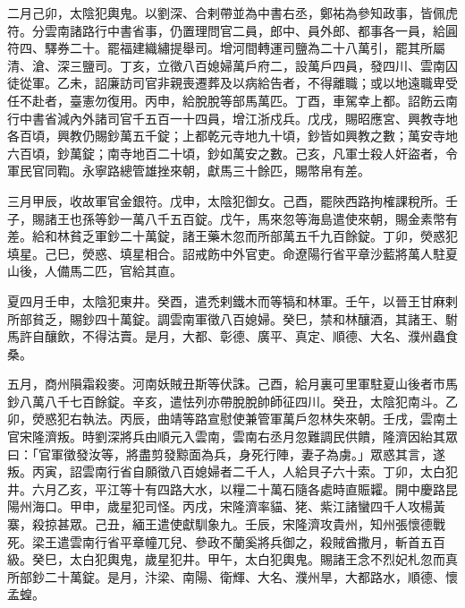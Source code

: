 \begin{pinyinscope}
 二月己卯，太陰犯輿鬼。以劉深、合剌帶並為中書右丞，鄭祐為參知政事，皆佩虎符。分雲南諸路行中書省事，仍置理問官二員，郎中、員外郎、都事各一員，給圓符四、驛券二十。罷福建織繡提舉司。增河間轉運司鹽為二十八萬引，罷其所屬清、滄、深三鹽司。丁亥，立徵八百媳婦萬戶府二，設萬戶四員，發四川、雲南囚徒從軍。乙未，詔廉訪司官非親喪遷葬及以病給告者，不得離職；或以地遠職卑受任不赴者，臺憲勿復用。丙申，給脫脫等部馬萬匹。丁酉，車駕幸上都。詔飭云南行中書省減內外諸司官千五百一十四員，增江浙戍兵。戊戌，賜昭應宮、興教寺地各百頃，興教仍賜鈔萬五千錠；上都乾元寺地九十頃，鈔皆如興教之數；萬安寺地六百頃，鈔萬錠；南寺地百二十頃，鈔如萬安之數。己亥，凡軍士殺人奸盜者，令軍民官同鞫。永寧路總管雄挫來朝，獻馬三十餘匹，賜幣帛有差。



 三月甲辰，收故軍官金銀符。戊申，太陰犯御女。己酉，罷陜西路拘榷課稅所。壬子，賜諸王也孫等鈔一萬八千五百錠。戊午，馬來忽等海島遣使來朝，賜金素幣有差。給和林貧乏軍鈔二十萬錠，諸王藥木忽而所部萬五千九百餘錠。丁卯，熒惑犯填星。己巳，熒惑、填星相合。詔戒飭中外官吏。命遼陽行省平章沙藍將萬人駐夏山後，人備馬二匹，官給其直。



 夏四月壬申，太陰犯東井。癸酉，遣禿剌鐵木而等犒和林軍。壬午，以晉王甘麻剌所部貧乏，賜鈔四十萬錠。調雲南軍徵八百媳婦。癸巳，禁和林釀酒，其諸王、駙馬許自釀飲，不得沽賣。是月，大都、彰德、廣平、真定、順德、大名、濮州蟲食桑。



 五月，商州隕霜殺麥。河南妖賊丑斯等伏誅。己酉，給月裏可里軍駐夏山後者市馬鈔八萬八千七百餘錠。辛亥，遣怯列亦帶脫脫帥師征四川。癸丑，太陰犯南斗。乙卯，熒惑犯右執法。丙辰，曲靖等路宣慰使兼管軍萬戶忽林失來朝。壬戌，雲南土官宋隆濟叛。時劉深將兵由順元入雲南，雲南右丞月忽難調民供饋，隆濟因紿其眾曰：「官軍徵發汝等，將盡剪發黥面為兵，身死行陣，妻子為虜。」眾惑其言，遂叛。丙寅，詔雲南行省自願徵八百媳婦者二千人，人給貝子六十索。丁卯，太白犯井。六月乙亥，平江等十有四路大水，以糧二十萬石隨各處時直賑糶。開中慶路昆陽州海口。甲申，歲星犯司怪。丙戌，宋隆濟率貓、狫、紫江諸蠻四千人攻楊黃寨，殺掠甚眾。己丑，緬王遣使獻馴象九。壬辰，宋隆濟攻貴州，知州張懷德戰死。梁王遣雲南行省平章幢兀兒、參政不蘭奚將兵御之，殺賊酋撒月，斬首五百級。癸巳，太白犯輿鬼，歲星犯井。甲午，太白犯輿鬼。賜諸王念不烈妃札忽而真所部鈔二十萬錠。是月，汴梁、南陽、衛輝、大名、濮州旱，大都路水，順德、懷孟蝗。




\end{pinyinscope}
